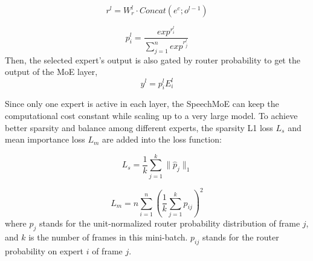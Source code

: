 \documentclass[a4paper]{article}
\begin{document}
\begin{equation}
  r^{l} = W_{r}^{l} \cdot Concat(e^{c};o^{l-1})
\end{equation}

\begin{equation}
  {p^{l}_{i}} = \frac{exp^{r^{l}_{i}}}{\sum_{j=1}^{n}exp^{r^{l}_{j}}}
\end{equation}
Then, the selected expert's output is also gated by router probability to get the output of the MoE layer,
\begin{equation}
y^{l} = p^{l}_{i} E^{l}_{i}
\end{equation}

Since only one expert is active in each layer, the SpeechMoE can keep the computational cost constant while scaling up to a very large model.
To achieve better sparsity and balance among different experts, the sparsity L1 loss $L_{s}$ and mean importance loss $L_{m}$ are added into the loss function:

\begin{equation}
L_{s}= \frac{1}{k}\sum_{j=1}^{k} \parallel{\hat{p}_{j}}\parallel_{1}
\end{equation}

\begin{equation}
{L}_{m}= n\sum_{i=1}^{n} ({\frac{1}{k}\sum_{j=1}^{k} p_{ij}})^{2}
\end{equation}
where $\hat{p}_{j}$ stands for the unit-normalized router probability distribution of frame $j$, and $k$ is the number of frames in this mini-batch. $p_{ij}$ stands for the router probability on expert $i$ of frame $j$.

\newcommand{\tabincell}[2]{\begin{tabular}{@{}#1@{}}#2\end{tabular}}
\end{document}
